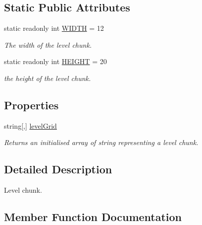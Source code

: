 \subsection*{Static Public Attributes}
\begin{DoxyCompactItemize}
\item 
static readonly int \hyperlink{class_infinite_jumper_1_1_level_chunk_a1e0f9070a662c732f06e798b3e77b58e}{W\+I\+D\+T\+H} = 12
\begin{DoxyCompactList}\small\item\em The width of the level chunk. \end{DoxyCompactList}\item 
static readonly int \hyperlink{class_infinite_jumper_1_1_level_chunk_a0513c73e059269d7d6ed74df9cb3774a}{H\+E\+I\+G\+H\+T} = 20
\begin{DoxyCompactList}\small\item\em the height of the level chunk. \end{DoxyCompactList}\end{DoxyCompactItemize}
\subsection*{Properties}
\begin{DoxyCompactItemize}
\item 
string\mbox{[},\mbox{]} \hyperlink{class_infinite_jumper_1_1_level_chunk_a05f4bc058f1040c62635712d09f064c7}{level\+Grid}
\begin{DoxyCompactList}\small\item\em Returns an initialised array of string representing a level chunk. \end{DoxyCompactList}\end{DoxyCompactItemize}


\subsection{Detailed Description}
Level chunk. 



\subsection{Member Function Documentation}
\hypertarget{class_infinite_jumper_1_1_level_chunk_a53e29a604e7e57f8d048600b14978a41}{}
